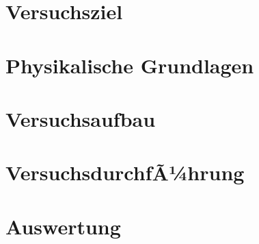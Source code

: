 ﻿\documentclass[12pt, a4paper]{scrartcl}
\title{\exptitle}
\subtitle{Fortgeschrittenen Praktikum 1}
\author{Moritz Bitterling und Benjamin Rottler \\ UniversitÃ¤t Freiburg}
\date{\expdate}
\numberwithin{equation}{section} %
\begin{document}
\hypersetup{pageanchor=false} %
\maketitle  %
\thispagestyle{empty}

\newpage
\tableofcontents
\thispagestyle{empty}

\newpage
\hypersetup{pageanchor=true} %
\setcounter{page}{1} %

\section{Versuchsziel}
 

\section{Physikalische Grundlagen}


\section{Versuchsaufbau}


\section{VersuchsdurchfÃ¼hrung}


\section{Auswertung}

\end{document}
